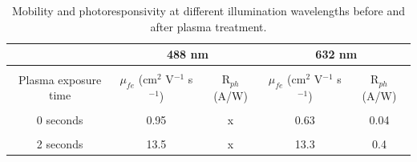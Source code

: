\documentclass[%
 reprint,
superscriptaddress,
 amsmath,amssymb,
 aps,
prb,
]{revtex4-1}
\begin{document}
\onecolumngrid

\begin{table}
\centering
\caption{Mobility and photoresponsivity at different illumination wavelengths before and after plasma treatment.}
\label{my-label}
\begin{tabular}{@{}ccccc@{}}
\toprule
                       & \multicolumn{2}{c}{488 nm} & \multicolumn{2}{c}{632 nm} \\ \hline \hline \\
\multicolumn{1}{c}{Plasma exposure time} &  $\mu_{fe}$ {\small (cm$^{2}$ V$^{-1}$ s$^{-1}$)}         &      R$_{ph}$ {\small (A/W)}     &    $\mu_{fe}$ {\small (cm$^{2}$ V$^{-1}$ s$^{-1}$) }      &    R$_{ph}$ {\small (A/W)}       \\ \hline \\
\multicolumn{1}{c}{0 seconds} &   0.95        &        x   &     0.63      &      0.04        \\ \hline \\
\multicolumn{1}{c}{2 seconds} &       13.5    &      x    & 13.3          &  0.4             \\ \hline
\end{tabular}
\end{table}
\end{document}
